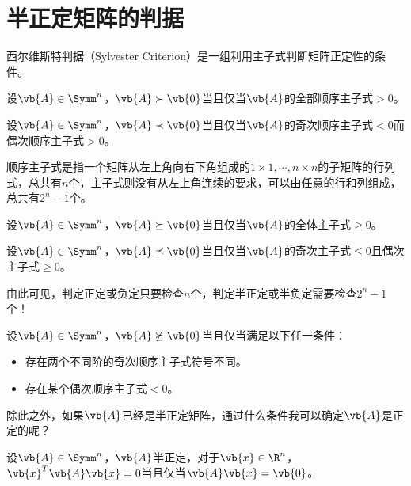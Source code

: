 \section{半正定矩阵的判据}

西尔维斯特判据（Sylvester Criterion）是一组利用主子式判断矩阵正定性的条件。

\begin{BoxProperty}[正定矩阵的西尔维斯特判据]
    设$\vb{A}\in\Symm^n$，$\vb{A}\succ\vb{0}$当且仅当$\vb{A}$的全部顺序主子式$>0$。
\end{BoxProperty}

\begin{BoxProperty}[负定矩阵的西尔维斯特判据]
    设$\vb{A}\in\Symm^n$，$\vb{A}\prec\vb{0}$当且仅当$\vb{A}$的奇次顺序主子式$<0$而偶次顺序主子式$>0$。
\end{BoxProperty}

顺序主子式是指一个矩阵从左上角向右下角组成的$1\times 1,\cdots,n\times n$的子矩阵的行列式，总共有$n$个，主子式则没有从左上角连续的要求，可以由任意的行和列组成，总共有$2^{n}-1$个。

\begin{BoxProperty}[半正定矩阵的西尔维斯特判据]
    设$\vb{A}\in\Symm^n$，$\vb{A}\succeq\vb{0}$当且仅当$\vb{A}$的全体主子式$\geq 0$。
\end{BoxProperty}

\begin{BoxProperty}[半负定矩阵的西尔维斯特判据]
    设$\vb{A}\in\Symm^n$，$\vb{A}\preceq\vb{0}$当且仅当$\vb{A}$的奇次主子式$\leq 0$且偶次主子式$\geq 0$。
\end{BoxProperty}

由此可见，判定正定或负定只要检查$n$个，判定半正定或半负定需要检查$2^{n}-1$个！

\begin{BoxProperty}[不定矩阵的判据]
    设$\vb{A}\in\Symm^n$，$\vb{A}\not\succeq\vb{0}$当且仅当满足以下任一条件：
    \begin{itemize}
        \item 存在两个不同阶的奇次顺序主子式符号不同。
        \item 存在某个偶次顺序主子式$<0$。
    \end{itemize}
\end{BoxProperty}

除此之外，如果$\vb{A}$已经是半正定矩阵，通过什么条件我可以确定$\vb{A}$是正定的呢？

\begin{BoxProperty}[半正定的等号成立条件]
    设$\vb{A}\in\Symm^n$，$\vb{A}$半正定，对于$\vb{x}\in\R^n$，$\vb{x}^T\vb{A}\vb{x}=0$当且仅当$\vb{A}\vb{x}=\vb{0}$。
\end{BoxProperty}

